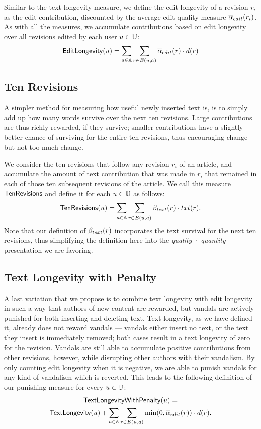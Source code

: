 \noindent
Similar to the text longevity measure, we define the edit longevity
of a revision $r_i$ as the edit contribution, discounted by the 
average edit quality measure ${\overline{\alpha}}_{edit}(r_i)$.
As with all the measures, we accumulate contributions based on 
edit longevity over all revisions edited by each user $u \in \mathbb{U}$:
%
\[
\mathsf{EditLongevity}(u) = \sum_{a \in \mathbb{A}} \sum_{r \in E(u, a)} 
{\overline{\alpha}}_{edit}(r) \cdot d(r)
\]
%

\subsection{Ten Revisions}

\noindent
A simpler method for measuring how useful newly inserted
text is, is to simply add up how many words survive over
the next ten revisions.
Large contributions are thus richly rewarded, if they survive;
smaller contributions have a slightly better chance of surviving
for the entire ten revisions, thus encouraging change ---
but not too much change.

We consider the ten revisions that follow any revision $r_i$ of an 
article, and accumulate the amount of text contribution that was made 
in $r_i$ that remained in each of those ten subsequent revisions
of the article.
We call this measure $\mathsf{TenRevisions}$ and define it for each
$u \in \mathbb{U}$ as follows:
%
\begin{gather*}
\mathsf{TenRevisions}(u) = 
\sum_{a \in \mathbb{A}} \sum_{r \in E(u, a)} \beta_{text}(r) \cdot txt(r).
\end{gather*}
%
Note that our definition of $\beta_{text}(r)$ incorporates
the text survival for the next ten revisions,
thus simplifying the definition here
into the \textit{quality}~$\cdot$~\textit{quantity}
presentation we are favoring.

\subsection{Text Longevity with Penalty}

\noindent
A last variation that we propose is to combine text longevity with 
edit longevity in such a way that authors of new content are rewarded, 
but vandals are actively punished for both inserting and deleting text.
Text longevity, as we have defined it, already does not
reward vandals --- vandals either insert no text, or the
text they insert is immediately removed; both cases result
in a text longevity of zero for the revision.
Vandals are still able to accumulate positive contributions
from other revisions, however, while disrupting other
authors with their vandalism.
By only counting edit longevity when it is negative,
we are able to punish vandals for any kind of vandalism
which is reverted.
This leads to the following definition of our punishing 
measure for every $u \in \mathbb{U}$:
%
\begin{gather*}
\mathsf{TextLongevityWithPenalty}(u) = \\
\mathsf{TextLongevity}(u) +
\sum_{a \in \mathbb{A}} \sum_{r \in E(u, a)} \min(0, {\overline{\alpha}}_{edit}(r)) \cdot d(r).
\end{gather*}
%

